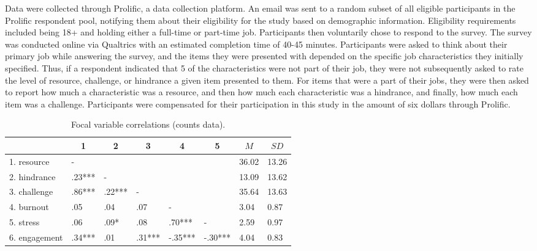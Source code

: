 \documentclass[
  man]{apa6}
\begin{document}
Data were collected through Prolific, a data collection platform. An email was sent to a random subset of all eligible participants in the Prolific respondent pool, notifying them about their eligibility for the study based on demographic information. Eligibility requirements included being 18+ and holding either a full-time or part-time job. Participants then voluntarily chose to respond to the survey. The survey was conducted online via Qualtrics with an estimated completion time of 40-45 minutes. Participants were asked to think about their primary job while answering the survey, and the items they were presented with depended on the specific job characteristics they initially specified. Thus, if a respondent indicated that 5 of the characteristics were not part of their job, they were not subsequently asked to rate the level of resource, challenge, or hindrance a given item presented to them. For items that were a part of their jobs, they were then asked to report how much a characteristic was a resource, and then how much each characteristic was a hindrance, and finally, how much each item was a challenge. Participants were compensated for their participation in this study in the amount of six dollars through Prolific.

\begin{table}[tbp]

\begin{center}
\begin{threeparttable}

\caption{\label{tab:correlation_table}Focal variable correlations (counts data).}

\begin{tabular}{llllllll}
\toprule
 & \multicolumn{1}{c}{1} & \multicolumn{1}{c}{2} & \multicolumn{1}{c}{3} & \multicolumn{1}{c}{4} & \multicolumn{1}{c}{5} & \multicolumn{1}{c}{$M$} & \multicolumn{1}{c}{$SD$}\\
\midrule
1. resource & - &  &  &  &  & 36.02 & 13.26\\
2. hindrance & .23*** & - &  &  &  & 13.09 & 13.62\\
3. challenge & .86*** & .22*** & - &  &  & 35.64 & 13.63\\
4. burnout & .05 & .04 & .07 & - &  & 3.04 & 0.87\\
5. stress & .06 & .09* & .08 & .70*** & - & 2.59 & 0.97\\
6. engagement & .34*** & .01 & .31*** & -.35*** & -.30*** & 4.04 & 0.83\\
\bottomrule
\end{tabular}

\end{threeparttable}
\end{center}

\end{table}
\end{document}
